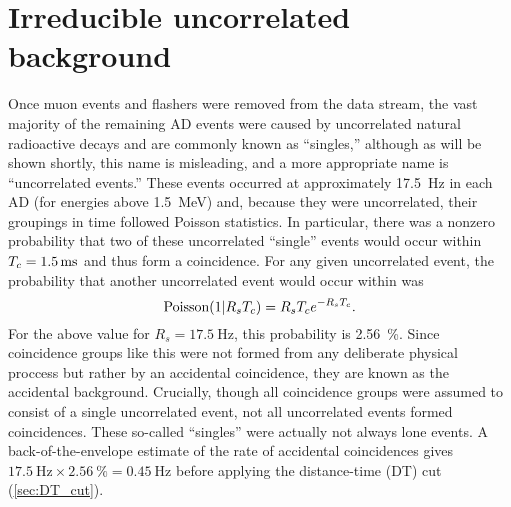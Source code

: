 
\section{Irreducible uncorrelated background}
\label{sec:acc}

Once muon events and flashers were removed from the data stream,
the vast majority of the remaining AD events were caused by uncorrelated
natural radioactive decays and are commonly known as ``singles,''
although as will be shown shortly, this name is misleading,
and a more appropriate name is ``uncorrelated events.''
These events occurred at approximately \SI{17.5}{\hertz} in each AD
(for energies above \SI{1.5}{\MeV})
and,
because they were uncorrelated, their groupings in time followed Poisson statistics.
In particular, there was a nonzero probability that
two of these uncorrelated ``single'' events would occur within
$T_c=\SI{1.5}{\milli\second}$ and thus form a  coincidence.
For any given uncorrelated event, the probability that
another uncorrelated event would occur within \tc{} was
\begin{equation}
    \text{Poisson}(1\vert R_sT_c) = R_sT_c e^{-R_sT_c}.
\end{equation}
For the above value for $R_s=\SI{17.5}{\hertz}$, this probability is \SI{2.56}{\percent}.
Since  coincidence groups like this were not formed from any
deliberate physical proccess but rather by an accidental coincidence,
they are known as the accidental background.
Crucially, though all  coincidence groups
were assumed to consist of a single uncorrelated event,
not all uncorrelated events formed  coincidences.
These so-called ``singles'' were actually not always lone events.
A back-of-the-envelope estimate of the rate of accidental coincidences gives
$\SI{17.5}{\hertz}\times\SI{2.56}{\percent}=\SI{0.45}{\hertz}$
before applying the distance-time (DT) cut (\cref{sec:DT_cut}).


